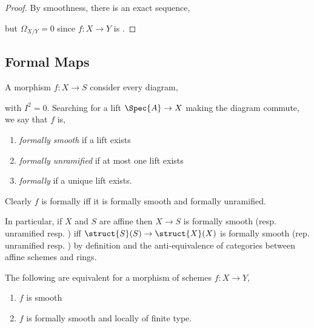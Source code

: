 \documentclass[12pt]{article}
\begin{document}
\begin{proof}
By smoothness, there is an exact sequence,
\begin{center}
\end{center}
but $\Omega_{X/Y} = 0$ since $f : X \to Y$ is \etale.
\end{proof}

\subsection{Formal Maps}

\begin{defn}
A morphism $f : X \to S$ consider every diagram,
\begin{center}
\end{center}
with $I^2 = 0$. Searching for a lift $\Spec{A} \to X$ making the diagram commute, we say that $f$ is,
\begin{enumerate}
\item \textit{formally smooth} if a lift exists
\item \textit{formally unramified} if at most one lift exists
\item \textit{formally \etale} if a unique lift exists.
\end{enumerate}
\end{defn}

\begin{rmk}
Clearly $f$ is formally \etale iff it is formally smooth and formally unramified. 
\end{rmk}

\begin{rmk}
In particular, if $X$ and $S$ are affine then $X \to S$ is formally smooth (resp. unramified resp. \etale) iff $\struct{S}(S) \to \struct{X}(X)$ is formally smooth (rep. unramified resp. \etale) by definition and the anti-equivalence of categories between affine schemes and rings.
\end{rmk}

\begin{theorem}
The following are equivalent for a morphism of schemes $f : X \to Y$,
\begin{enumerate}
\item $f$ is smooth
\item $f$ is formally smooth and locally of finite type.
\end{enumerate}
\end{theorem}
\end{document}
